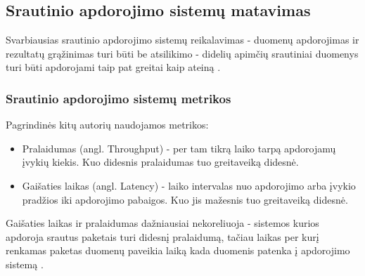 \documentclass{VUMIFPSbakalaurinis}
\begin{document}
\subsection{Srautinio apdorojimo sistemų matavimas}
Svarbiausias srautinio apdorojimo sistemų reikalavimas - duomenų apdorojimas ir rezultatų grąžinimas turi būti be atsilikimo - didelių apimčių srautiniai duomenys turi būti apdorojami taip pat greitai kaip ateiną \cite{stonebraker20058}. 

\subsubsection{Srautinio apdorojimo sistemų metrikos}
Pagrindinės kitų autorių naudojamos metrikos:
\begin{itemize}
    \item Pralaidumas (angl. Throughput) - per tam tikrą laiko tarpą apdorojamų įvykių kiekis. Kuo didesnis pralaidumas tuo greitaveiką didesnė. 
    \item Gaišaties laikas (angl. Latency) - laiko intervalas nuo apdorojimo arba įvykio pradžios iki apdorojimo pabaigos. Kuo jis mažesnis tuo greitaveiką didesnė.
\end{itemize}
Gaišaties laikas ir pralaidumas dažniausiai nekoreliuoja - sistemos kurios apdoroja srautus paketais turi didesnį pralaidumą, tačiau laikas per kurį renkamas paketas duomenų paveikia laiką kada duomenis patenka į apdorojimo sistemą \cite{Karimov2018BenchmarkingDS}. \par
\end{document}
